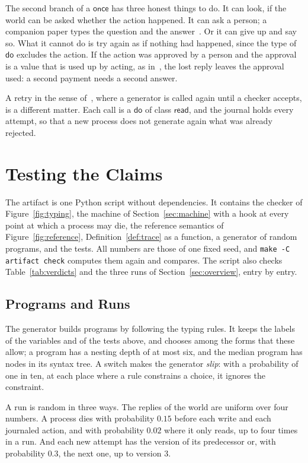 \documentclass[acmsmall,nonacm,screen]{acmart}
\newcommand{\kw}[1]{\mathsf{#1}}
\newcommand{\rd}{\kw{read}}
\begin{document}
The second branch of a $\kw{once}$ has three honest things to do. It can look, if the world
can be asked whether the action happened. It can ask a person; a companion paper types the
question and the answer~\citep{tpp7}. Or it can give up and say so. What it cannot do is try
again as if nothing had happened, since the type of $\kw{do}$ excludes the action. If the
action was approved by a person and the approval is a value that is used up by acting, as
in~\citet{tpp4}, the lost reply leaves the approval used: a second payment needs a second
answer.

A retry in the sense of~\citet{tpp3}, where a generator is called again until a checker
accepts, is a different matter. Each call is a $\kw{do}$ of class $\rd$, and the journal
holds every attempt, so that a new process does not generate again what was already rejected.

\section{Testing the Claims}
\label{sec:tests}

The artifact is one Python script without dependencies. It contains the checker of
Figure~\ref{fig:typing}, the machine of Section~\ref{sec:machine} with a hook at every point
at which a process may die, the reference semantics of Figure~\ref{fig:reference},
Definition~\ref{def:trace} as a function, a generator of random programs, and the tests. All
numbers are those of one fixed seed, and \texttt{make -C artifact check} computes them again
and compares. The script also checks Table~\ref{tab:verdicts} and the three runs of
Section~\ref{sec:overview}, entry by entry.

\subsection{Programs and Runs}

The generator builds programs by following the typing rules. It keeps the labels of the
variables and of the tests above, and chooses among the forms that these allow; a program has
a nesting depth of at most six, and the median program has \exMedianNodes{} nodes in its
syntax tree. A switch makes the generator \emph{slip}: with a probability of one in ten, at
each place where a rule constrains a choice, it ignores the constraint.

A run is random in three ways. The replies of the world are uniform over four numbers. A
process dies with probability $0.15$ before each write and each journaled action, and with
probability $0.02$ where it only reads, up to four times in a run. And each new attempt has
the version of its predecessor or, with probability $0.3$, the next one, up to version $3$.
\end{document}
